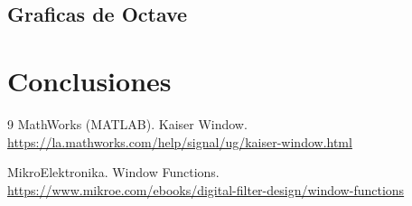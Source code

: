 \documentclass[11pt,a4paper]{article}
\begin{document}

\subsection{Graficas de Octave}


\section{Conclusiones}


\begin{thebibliography}{9}
    MathWorks (MATLAB). Kaiser Window.\\
    \url{https://la.mathworks.com/help/signal/ug/kaiser-window.html}

    MikroElektronika. Window Functions.\\
    \url{https://www.mikroe.com/ebooks/digital-filter-design/window-functions}
\end{thebibliography}
\end{document}
